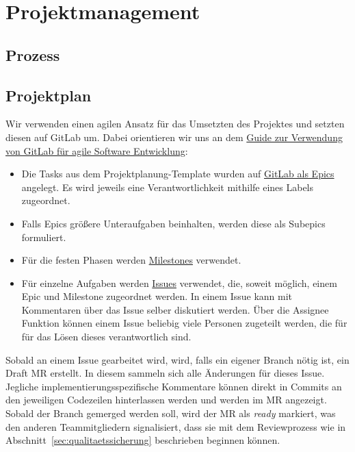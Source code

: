 \chapter{Projektmanagement}\label{ch:projektmanagement}



\section{Prozess}\label{sec:prozess}



\section{Projektplan}\label{sec:projektplan}

Wir verwenden einen agilen Ansatz für das Umsetzten des Projektes und setzten diesen auf GitLab um.
Dabei orientieren wir uns an dem
\href{https://about.gitlab.com/blog/2018/03/05/gitlab-for-agile-software-development/}{Guide
zur Verwendung von GitLab für agile Software Entwicklung}:
\begin{itemize}
    \item Die Tasks aus dem Projektplanung-Template wurden auf
    \href{https://git.haw-hamburg.de/groups/ss21-esep-gruppe-2.3/-/epics}{GitLab als Epics} angelegt.
    Es wird jeweils eine Verantwortlichkeit mithilfe eines Labels zugeordnet.
    \item Falls Epics größere Unteraufgaben beinhalten, werden diese als Subepics formuliert.
    \item Für die festen Phasen werden
    \href{https://git.haw-hamburg.de/groups/ss21-esep-gruppe-2.3/-/milestones}{Milestones} verwendet.
    \item Für einzelne Aufgaben werden
    \href{https://git.haw-hamburg.de/groups/ss21-esep-gruppe-2.3/-/issues}{Issues}
    verwendet, die, soweit möglich, einem Epic und Milestone zugeordnet werden.
    In einem Issue kann mit Kommentaren über das Issue selber diskutiert werden.
    Über die Assignee Funktion können einem Issue beliebig viele Personen zugeteilt werden, die für
    für das Lösen dieses verantwortlich sind.
\end{itemize}
Sobald an einem Issue gearbeitet wird, wird, falls ein eigener Branch nötig ist, ein Draft MR
erstellt.
In diesem sammeln sich alle Änderungen für dieses Issue.
Jegliche implementierungsspezifische Kommentare können direkt in Commits an den jeweiligen
Codezeilen hinterlassen werden und werden im MR angezeigt.
Sobald der Branch gemerged werden soll, wird der MR als \textit{ready} markiert, was den anderen
Teammitgliedern signalisiert, dass sie mit dem Reviewprozess wie in
Abschnitt~\ref{sec:qualitaetssicherung} beschrieben beginnen können.


